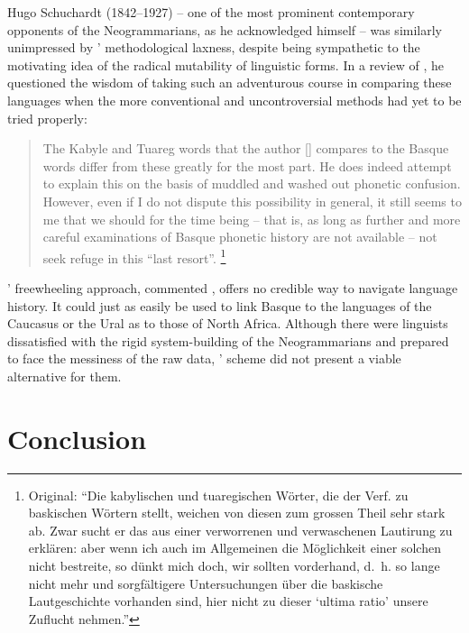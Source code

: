 \documentclass[output=paper]{langscibook}
\begin{document}
Hugo Schuchardt (1842--1927) -- one of the most prominent contemporary opponents of the Neogrammarians, as he acknowledged himself \citep[see, e.g., ][]{Schuchardt1928} -- was similarly unimpressed by {\Gabelentz}' methodological laxness, despite being sympathetic to the motivating idea of the radical mutability of linguistic forms. In a review of \citet{Gabelentz1894bb}, he questioned the wisdom of taking such an adventurous course in comparing these languages when the more conventional and uncontroversial methods had yet to be tried properly:

\largerpage[1]\begin{quotation}
The Kabyle and Tuareg words that the author [{\Gabelentz}] compares to the Basque words differ from these greatly for the most part. He does indeed attempt to explain this on the basis of muddled and washed out phonetic confusion. However, even if I do not dispute this possibility in general, it still seems to me that we should for the time being -- that is, as long as further and more careful examinations of Basque phonetic history are not available -- not seek refuge in this ``last resort''. \citep[334]{Schuchardt1893}\footnote{Original: ``Die kabylischen und tuaregischen Wörter, die der Verf. zu baskischen Wörtern stellt, weichen von diesen zum grossen Theil sehr stark ab. Zwar sucht er das aus einer verworrenen und verwaschenen Lautirung zu erklären: aber wenn ich auch im Allgemeinen die Möglichkeit einer solchen nicht bestreite, so dünkt mich doch, wir sollten vorderhand, d.~h. so lange nicht mehr und sorgfältigere Untersuchungen über die baskische Lautgeschichte vorhanden sind, hier nicht zu dieser `ultima ratio' unsere Zuflucht nehmen.''}
\end{quotation}

{\Gabelentz}' freewheeling approach, commented \citet[334]{Schuchardt1893}, offers no credible way to navigate language history. It could just as easily be used to link Basque to the languages of the Caucasus or the Ural as to those of North Africa. Although there were linguists dissatisfied with the rigid system-building of the Neogrammarians and prepared to face the messiness of the raw data, {\Gabelentz}' scheme did not present a viable alternative for them.

\section{Conclusion}
\label{sec:mcelvenny:conc}
\end{document}
